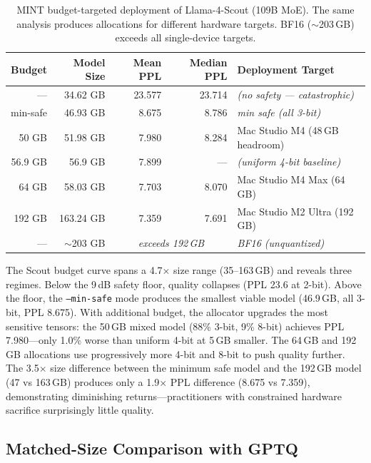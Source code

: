 \documentclass{article}
\begin{document}
\begin{table}[h]
\centering
\caption{MINT budget-targeted deployment of Llama-4-Scout (109B MoE). The same analysis produces allocations for different hardware targets. BF16 (${\sim}$203\,GB) exceeds all single-device targets.}
\label{tab:scout_budget}
\begin{tabular}{rrrrl}
\toprule
Budget & Model Size & Mean PPL & Median PPL & Deployment Target \\
\midrule
--- & 34.62 GB & 23.577 & 23.714 & \emph{(no safety --- catastrophic)} \\
min-safe & 46.93 GB & 8.675 & 8.786 & \emph{min safe (all 3-bit)} \\
50 GB & 51.98 GB & 7.980 & 8.284 & Mac Studio M4 (48\,GB headroom) \\
56.9 GB & 56.9 GB & 7.899 & --- & \emph{(uniform 4-bit baseline)} \\
64 GB & 58.03 GB & 7.703 & 8.070 & Mac Studio M4 Max (64\,GB) \\
192 GB & 163.24 GB & 7.359 & 7.691 & Mac Studio M2 Ultra (192\,GB) \\
--- & ${\sim}$203 GB & \multicolumn{2}{c}{\emph{exceeds 192\,GB}} & \emph{BF16 (unquantized)} \\
\bottomrule
\end{tabular}
\end{table}

The Scout budget curve spans a 4.7$\times$ size range (35--163\,GB) and reveals three regimes. Below the 9\,dB safety floor, quality collapses (PPL 23.6 at 2-bit). Above the floor, the \texttt{--min-safe} mode produces the smallest viable model (46.9\,GB, all 3-bit, PPL 8.675). With additional budget, the allocator upgrades the most sensitive tensors: the 50\,GB mixed model (88\% 3-bit, 9\% 8-bit) achieves PPL 7.980---only 1.0\% worse than uniform 4-bit at 5\,GB smaller. The 64\,GB and 192\,GB allocations use progressively more 4-bit and 8-bit to push quality further. The 3.5$\times$ size difference between the minimum safe model and the 192\,GB model (47 vs 163\,GB) produces only a 1.9$\times$ PPL difference (8.675 vs 7.359), demonstrating diminishing returns---practitioners with constrained hardware sacrifice surprisingly little quality.

\subsection{Matched-Size Comparison with GPTQ}
\label{sec:gptq_comparison}
\end{document}
